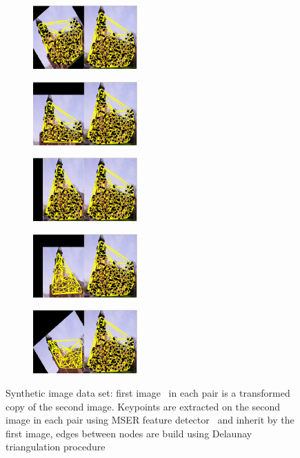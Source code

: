 \begin{figure}[h] 
		\begin{subfigure}[b]{0.3\textwidth}
			\centering
			\includegraphics[width=4cm]{"chapter3/fig/ImageTrafo/Img_pair1"} 
			\caption{}\label{fig:ImageTrafo_initGraphs_a}
		\end{subfigure}
		\begin{subfigure}[b]{0.3\textwidth}
			\centering
			\includegraphics[width=4cm]{"chapter3/fig/ImageTrafo/Img_pair2"} 
			\caption{}
		\end{subfigure} 
		\begin{subfigure}[b]{0.3\textwidth}
			\centering
			\includegraphics[width=4cm]{"chapter3/fig/ImageTrafo/Img_pair3"}
			\caption{}
		\end{subfigure} 	
		\begin{subfigure}[b]{0.5\textwidth}
			\centering
			\includegraphics[width=4cm]{"chapter3/fig/ImageTrafo/Img_pair4"} 
			\caption{}
		\end{subfigure} 
		\begin{subfigure}[b]{0.5\textwidth}
			\centering
			\includegraphics[width=4cm]{"chapter3/fig/ImageTrafo/Img_pair5"}
			\caption{}
		\end{subfigure} 	
	\caption[Synthetic image data set]{Synthetic image data set: first image~\cite{SUN} in each pair is a transformed copy of the second image. Keypoints are extracted on the second image in each pair using MSER feature detector~\cite{MSER} and inherit by the first image, edges between nodes are build using Delaunay triangulation procedure~\cite{Hancock_EM_SVD,Hancock_GM_SpectralPart}}
	\label{fig:ImageTrafo_initGraphs}
\end{figure}

